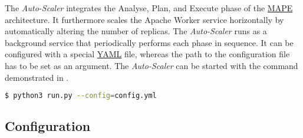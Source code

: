 The \textit{Auto-Scaler} integrates the Analyse, Plan, and Execute phase of the \hyperlink{abbr:mape}{MAPE} architecture. It furthermore scales the Apache Worker service horizontally by automatically altering the number of replicas.
The \textit{Auto-Scaler} runs as a background service that periodically performs each phase in sequence.
It can be configured with a special \hyperlink{abbr:yaml}{YAML} file, whereas the path to the configuration file has to be set as an argument.
The \textit{Auto-Scaler} can be started with the command demonstrated in .
\begin{lstlisting}[label=lst:06_auto-scaler_start, caption=\textit{Auto-Scaler} start command, language=sh, numbers=none]
$ python3 run.py --config=config.yml
\end{lstlisting}


\subsection{Configuration}

